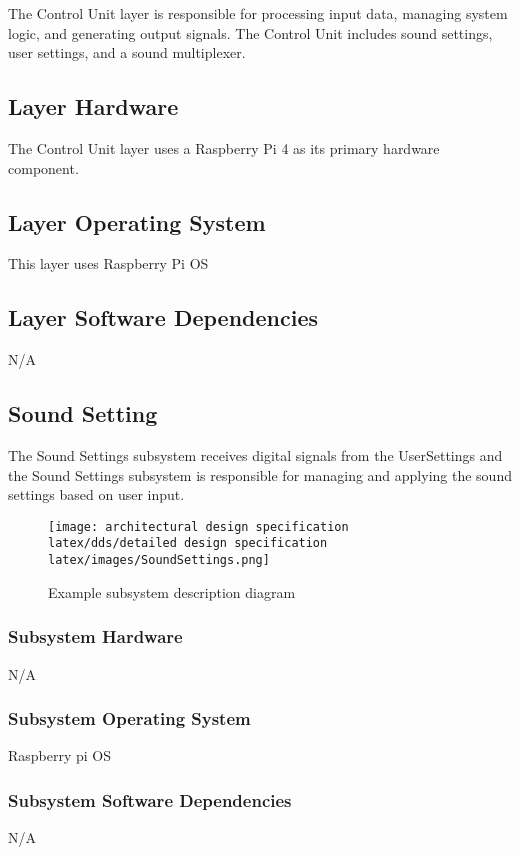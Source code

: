 The Control Unit layer is responsible for processing input data, managing system logic, and generating output signals. The Control Unit includes sound settings, user settings, and a sound multiplexer.

\subsection{Layer Hardware}
The Control Unit layer uses a Raspberry Pi 4 as its primary hardware component.

\subsection{Layer Operating System}
This layer uses Raspberry Pi OS

\subsection{Layer Software Dependencies}
N/A

\subsection{Sound Setting}
The Sound Settings subsystem receives digital signals from the UserSettings and the Sound Settings subsystem is responsible for managing and applying the sound settings based on user input.

\begin{figure}[h!]
	\centering
 	\texttt{[image: architectural design specification latex/dds/detailed design specification latex/images/SoundSettings.png]}
 \caption{Example subsystem description diagram}
\end{figure}

\subsubsection{Subsystem Hardware}
N/A

\subsubsection{Subsystem Operating System}
Raspberry pi OS    

\subsubsection{Subsystem Software Dependencies}
 N/A

